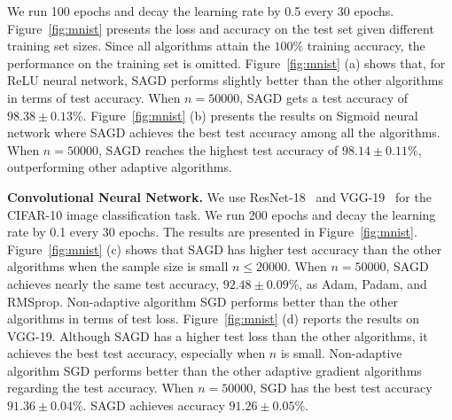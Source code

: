 \documentclass[11pt]{article}
\begin{document}
We run 100 epochs and decay the learning rate by 0.5 every 30 epochs. 
Figure~\ref{fig:mnist} presents the loss and accuracy on the test set given different training set sizes. 
Since all algorithms attain the $100\%$ training accuracy, the performance on the training set is omitted. 
Figure~\ref{fig:mnist} (a) shows that, for ReLU neural network, \textsc{SAGD} performs slightly better than the other algorithms in terms of test accuracy. When $n =50000$, \textsc{SAGD} gets a test accuracy of $98.38 \pm 0.13 \%$. 
Figure~\ref{fig:mnist} (b) presents the results on Sigmoid neural network where \textsc{SAGD} achieves the best test accuracy among all the algorithms. When $n =50000$, \textsc{SAGD} reaches the highest test accuracy of $98.14 \pm 0.11 \%$, outperforming other adaptive algorithms.


\textbf{Convolutional Neural Network.}
We use ResNet-18~\citep{hezh2016} and VGG-19~\citep{sizi2014} for the CIFAR-10 image classification task. 
We run 200 epochs and decay the learning rate by 0.1 every 30 epochs. 
The results are presented in Figure~\ref{fig:mnist}. 
Figure~\ref{fig:mnist} (c) shows that \textsc{SAGD} has higher test accuracy than the 
other algorithms when the sample size is small \ie $n \leq 20000$.
When $n = 50000$, \textsc{SAGD} achieves nearly the same test accuracy, $92.48 \pm 0.09\%$,  as Adam, Padam, and RMSprop.
Non-adaptive algorithm SGD performs better than the other algorithms in terms of test loss. 
Figure~\ref{fig:mnist} (d) reports the results on VGG-19. Although \textsc{SAGD} has a higher test loss than the other algorithms, it achieves the best test accuracy, especially when $n$ is small. Non-adaptive algorithm SGD performs better than the other adaptive gradient algorithms regarding the test accuracy.
When $n= 50000$, SGD has the best test accuracy $91.36 \pm 0.04\%$. \textsc{SAGD} achieves accuracy $91.26 \pm 0.05\%$.
\end{document}
